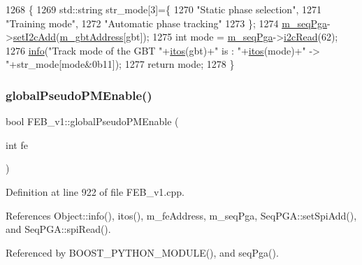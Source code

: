 \begin{DoxyCode}
1268                                  \{
1269   std::string str\_mode[3]=\{
1270     \textcolor{stringliteral}{"Static phase selection"},
1271     \textcolor{stringliteral}{"Training mode"},
1272     \textcolor{stringliteral}{"Automatic phase tracking"}
1273   \};
1274   \hyperlink{classFEB__v1_a6c7804ac86796f233a8393043adf2e77}{m\_seqPga}->\hyperlink{classSeqPGA_a4ef334e4d2cb417b49033dce951728cd}{setI2cAdd}(\hyperlink{classFEB__v1_ac625855df976f16694178f1a4c0eef1e}{m\_gbtAddress}[gbt]);
1275   \textcolor{keywordtype}{int} mode = \hyperlink{classFEB__v1_a6c7804ac86796f233a8393043adf2e77}{m\_seqPga}->\hyperlink{classSeqPGA_a7cd344df2be99f3a02b487f80e87b27e}{i2cRead}(62);
1276   \hyperlink{classObject_a644fd329ea4cb85f54fa6846484b84a8}{info}(\textcolor{stringliteral}{"Track mode of the GBT "}+\hyperlink{Tools_8h_af330027dbdafb9a30768b3613c553e60}{itos}(gbt)+\textcolor{stringliteral}{" is : "}+\hyperlink{Tools_8h_af330027dbdafb9a30768b3613c553e60}{itos}(mode)+\textcolor{stringliteral}{" -> "}+str\_mode[mode&0b11]); 
1277   \textcolor{keywordflow}{return} mode; 
1278 \}
\end{DoxyCode}
\mbox{\label{classFEB__v1_acfaf998ce0166362401e5253502a16d2}} 
\subsubsection{\texorpdfstring{global\+Pseudo\+P\+M\+Enable()}{globalPseudoPMEnable()}}
{\footnotesize\ttfamily bool F\+E\+B\+\_\+v1\+::global\+Pseudo\+P\+M\+Enable (\begin{DoxyParamCaption}\item[{int}]{fe }\end{DoxyParamCaption})}



Definition at line 922 of file F\+E\+B\+\_\+v1.\+cpp.



References Object\+::info(), itos(), m\+\_\+fe\+Address, m\+\_\+seq\+Pga, Seq\+P\+G\+A\+::set\+Spi\+Add(), and Seq\+P\+G\+A\+::spi\+Read().



Referenced by B\+O\+O\+S\+T\+\_\+\+P\+Y\+T\+H\+O\+N\+\_\+\+M\+O\+D\+U\+L\+E(), and seq\+Pga().


